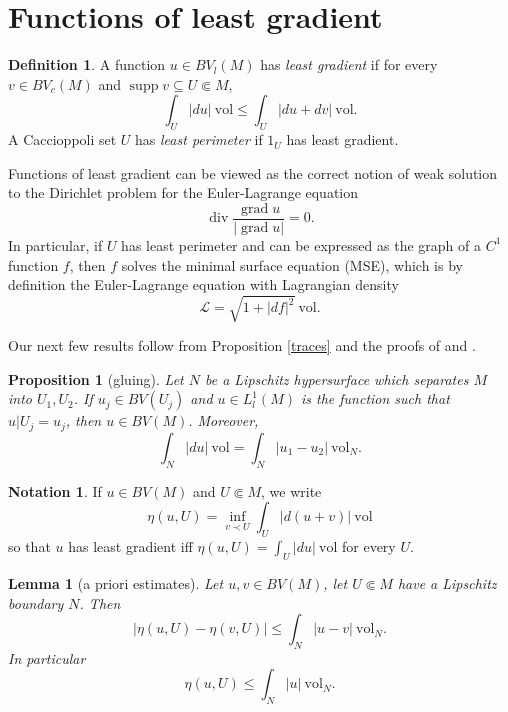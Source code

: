 \documentclass[reqno,12pt,letterpaper]{amsart}
\DeclareMathOperator{\supp}{supp}
\DeclareMathOperator{\Div}{div}
\DeclareMathOperator{\grad}{grad}
\newcommand{\vol}{\mathrm{vol}}
\newcommand{\dfn}[1]{\emph{#1}\index{#1}}
\newtheorem{lemma}[theorem]{Lemma}
\newtheorem{proposition}[theorem]{Proposition}
\theoremstyle{definition}
\newtheorem{definition}[theorem]{Definition}
\newtheorem{notation}[theorem]{Notation}
\numberwithin{equation}{section}
\begin{document}
\section{Functions of least gradient}\label{RiemMeasureThy}
\begin{definition}\label{main definitions}
A function $u \in BV_l(M)$ has \dfn{least gradient} if for every $v \in BV_c(M)$ and $\supp v \subseteq U \Subset M$,
$$\int_U |du| ~\vol \leq \int_U |du + dv| ~\vol.$$
A Caccioppoli set $U$ has \dfn{least perimeter} if $1_U$ has least gradient.
\end{definition}

Functions of least gradient can be viewed as the correct notion of weak solution to the Dirichlet problem for the Euler-Lagrange equation
\begin{equation}\label{EulerLagrange}
\Div \frac{\grad u}{|\grad u|} = 0.
\end{equation}
In particular, if $U$ has least perimeter and can be expressed as the graph of a $C^1$ function $f$, then $f$ solves the minimal surface equation (MSE), which is by definition the Euler-Lagrange equation with Lagrangian density
\begin{equation}\label{Lagrangian density}
\mathscr L = \sqrt{1 + |df|^2} ~\vol.
\end{equation}

Our next few results follow from Proposition \ref{traces} and the proofs of \cite[Teorema 2]{Miranda67} and \cite[Lemma 5.6]{Giusti77}.

\begin{proposition}[gluing]\label{gluing}
Let $N$ be a Lipschitz hypersurface which separates $M$ into $U_1,U_2$.
If $u_j \in BV(U_j)$ and $u \in L^1_l(M)$ is the function such that $u|U_j = u_j$, then $u \in BV(M)$.
Moreover,
\begin{equation}
\label{glued BV norm}
\int_N |du| ~\vol = \int_N |u_1 - u_2| ~\vol_N.
\end{equation}
\end{proposition}

\begin{notation}
If $u \in BV(M)$ and $U \Subset M$, we write
$$\eta(u, U) = \inf_{v \prec U} \int_U |d(u+v)| ~\vol$$
so that $u$ has least gradient iff $\eta(u, U) = \int_U |du| ~\vol$ for every $U$.
\end{notation}

\begin{lemma}[a priori estimates]\label{estimates on good set}
Let $u, v \in BV(M)$, let $U \Subset M$ have a Lipschitz boundary $N$. Then
\begin{equation}\label{a priori estimate 1}
|\eta(u, U) - \eta(v, U)| \leq \int_N |u - v| ~\vol_N.
\end{equation}
In particular
\begin{equation}\label{a priori estimate 2}
\eta(u, U) \leq \int_N |u| ~\vol_N.
\end{equation}
\end{lemma}
\end{document}
